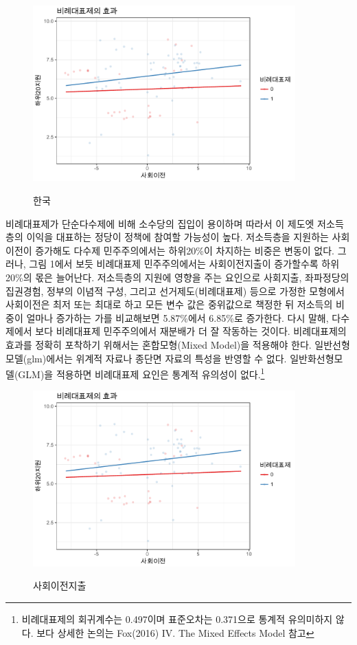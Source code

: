 \documentclass[12pt,a4paper]{book}
\begin{document}
\begin{figure}
\centering
        \includegraphics[width=0.9\textwidth]{pr_sstran.pdf}\\
        \caption{한국}
\end{figure}

비례대표제가 단순다수제에 비해 소수당의 집입이 용이하며 따라서 이 제도엣 저소득층의 이익을 대표하는 정당이 정책에 참여할 가능성이 높다.  저소득층을 지원하는 사회이전이 증가해도 다수제 민주주의에서는 하위20\%이 차지하는 비중은 변동이 없다. 그러나, 그림 1에서 보듯 비례대표제 민주주의에서는 사회이전지출이 증가할수록 하위20\%의 몫은 늘어난다. 저소득층의 지원에 영향을 주는 요인으로 사회지출, 좌파정당의 집권경험, 정부의 이념적 구성, 그리고 선거제도(비례대표제) 등으로 가정한 모형에서 사회이전은 최저 또는 최대로 하고 모든 변수 값은 중위값으로 책정한 뒤 저소득의 비중이 얼마나 증가하는 가를 비교해보면 5.87\%에서 6.85\%로 증가한다. 다시 말해, 다수제에서 보다 비례대표제 민주주의에서 재분배가 더 잘 작동하는 것이다. 비례대표제의 효과를 정확히 포착하기 위해서는 혼합모형(Mixed Model)을 적용해야 한다. 일반선형모델(glm)에서는 위계적 자료나 종단면 자료의 특성을 반영할 수 없다. 일반화선형모델(GLM)을 적용하면 비례대표제 요인은 통계적 유의성이 없다.\footnote{비례대표제의 회귀계수는 0.497이며 표준오차는 0.371으로 통계적 유의미하지 않다. 보다 상세한 논의는 Fox(2016) IV. The Mixed Effects Model 참고} \\

\begin{figure}
\centering
        \includegraphics[width=0.9\textwidth]{pr_sstran.pdf}\\
        \caption{사회이전지출}
\end{figure}
\end{document}
